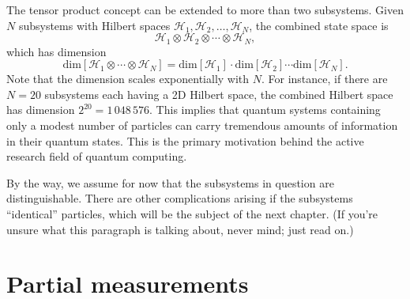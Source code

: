 \documentclass[pra,12pt]{revtex4-2}
\begin{document}
The tensor product concept can be extended to more than two
subsystems.  Given $N$ subsystems with Hilbert spaces $\mathscr{H}_1,
\mathscr{H}_2, \dots, \mathscr{H}_N$, the combined state space is
\begin{equation}
  \mathscr{H}_1 \otimes \mathscr{H}_2 \otimes \cdots \otimes
  \mathscr{H}_N,
\end{equation}
which has dimension
\begin{equation}
  \mathrm{dim}\left[\mathscr{H}_1 \otimes \cdots \otimes \mathscr{H}_N\right]
  = \mathrm{dim}\left[\mathscr{H}_1\right] \cdot
  \mathrm{dim}\left[\mathscr{H}_2\right] \cdots
  \mathrm{dim}\left[\mathscr{H}_N\right].
\end{equation}
Note that the dimension scales exponentially with $N$.  For instance,
if there are $N = 20$ subsystems each having a 2D Hilbert space, the
combined Hilbert space has dimension $2^{20} =1\,048\,576$.  This
implies that quantum systems containing only a modest number of
particles can carry tremendous amounts of information in their quantum
states.  This is the primary motivation behind the active research
field of quantum computing.


By the way, we assume for now that the subsystems in question are
distinguishable.  There are other complications arising if the
subsystems ``identical'' particles, which will be the subject of the
next chapter.  (If you're unsure what this paragraph is talking about,
never mind; just read on.)

\section{Partial measurements}
\label{sec:partialmeasurements}
\end{document}
